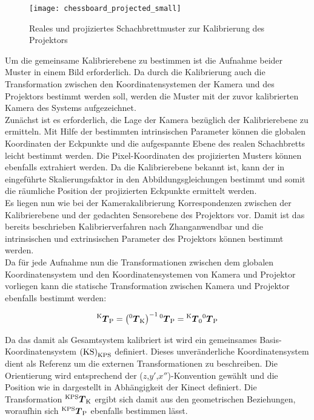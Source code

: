 \begin{figure}[ht]
	\begin{center}
		\texttt{[image: chessboard\_projected\_small]}
		\caption{Reales und projiziertes Schachbrettmuster zur Kalibrierung des Projektors}
		\label{fig.projcalib}
	\end{center}
\end{figure}

Um die gemeinsame Kalibrierebene zu bestimmen ist die Aufnahme beider Muster in einem Bild erforderlich. Da durch die Kalibrierung auch die Transformation zwischen den Koordinatensystemen der Kamera und des Projektors bestimmt werden soll, werden die Muster mit der zuvor kalibrierten Kamera des Systems aufgezeichnet.\\

Zunächst ist es erforderlich, die Lage der Kamera bezüglich der Kalibrierebene zu ermitteln. Mit Hilfe der bestimmten intrinsischen Parameter können die globalen Koordinaten der Eckpunkte und die aufgespannte Ebene des realen Schachbretts leicht bestimmt werden. Die Pixel-Koordinaten des projizierten Musters können ebenfalls extrahiert werden. Da die Kalibrierebene bekannt ist, kann der in  eingeführte Skalierungsfaktor in den Abbildungsgleichungen bestimmt und somit die räumliche Position der projizierten Eckpunkte ermittelt werden.\\

Es liegen nun wie bei der Kamerakalibrierung Korrespondenzen zwischen der Kalibrierebene und der gedachten Sensorebene des Projektors vor. Damit ist das bereits beschrieben Kalibrierverfahren nach Zhang\red[Groß?] anwendbar und die intrinsischen und extrinsischen Parameter des Projektors können bestimmt werden.\\
Da für jede Aufnahme nun die Transformationen zwischen dem globalen Koordinatensystem und den Koordinatensystemen von Kamera und Projektor vorliegen kann die statische Transformation zwischen Kamera und Projektor ebenfalls bestimmt werden:

\begin{equation}
{^{\mathrm{K}}\mbox{\boldmath{$T$}}_{\mathrm{P}}} = \left( {^{\mathrm{0}}\mbox{\boldmath{$T$}}_{\mathrm{K}}} \right)^{-1} {^{\mathrm{0}}\mbox{\boldmath{$T$}}_{\mathrm{P}}} = {^{\mathrm{K}}\mbox{\boldmath{$T$}}_{\mathrm{0}}} {^{\mathrm{0}}\mbox{\boldmath{$T$}}_{\mathrm{P}}}
\end{equation}

Da das \kps{} damit als Gesamtsystem kalibriert ist wird ein gemeinsames Basis-Koordinatensystem ${\mathrm{(KS)}}_{\mathrm{KPS}}$ definiert. Dieses unveränderliche Koordinatensystem dient als Referenz um die externen Transformationen zu beschreiben. Die Orientierung wird entsprechend der ($z$,$y'$,$x''$)-Konvention gewählt und die Position wie in  dargestellt in Abhängigkeit der Kinect definiert. Die Transformation ${^{\mathrm{KPS}}\mbox{\boldmath{$T$}}_{\mathrm{K}}}$ ergibt sich damit aus den geometrischen Beziehungen, woraufhin sich ${^{\mathrm{KPS}}\mbox{\boldmath{$T$}}_{\mathrm{P}}}$ ebenfalls bestimmen lässt.


